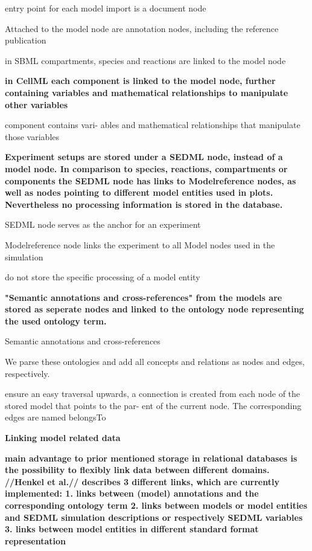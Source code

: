 \par entry point for each model import is a document node
\par Attached to the model node
are annotation nodes, including the reference publication
\par in SBML compartments, species and reactions are linked to the model node\par \textbf{in CellML each component is linked to the model node, further containing variables and mathematical relationships to manipulate other variables}

\par component contains vari-
ables and mathematical relationships that manipulate
those variables\par \textbf{Experiment setups are stored under a SEDML node, instead of a model node. In comparison to species, reactions, compartments or components the SEDML node has links to Modelreference nodes, as well as nodes pointing to different model entities used in plots. Nevertheless no processing information is stored in the database.}

\par SEDML node serves as the anchor for an experiment
\par  Modelreference node links the experiment to all
Model nodes used in the simulation
\par do not store the specific processing of a
model entity\par \textbf{"Semantic annotations and cross-references" from the models are stored as seperate nodes and linked to the ontology node representing the used ontology term.}

\par Semantic annotations and cross-references
\par  We parse these ontologies and add all concepts
and relations as nodes and edges, respectively.
\par ensure an easy traversal upwards, a connection is created
from each node of the stored model that points to the par-
ent of the current node. The corresponding edges are
named belongsTo\par \textbf{Linking model related data}
\par \textbf{main advantage to prior mentioned storage in relational databases is the possibility to flexibly link data between different domains. //Henkel et al.// describes 3 different links, which are currently implemented:
1. links between (model) annotations and the corresponding ontology term
2. links between models or model entities and SEDML simulation descriptions or respectively SEDML variables
3. links between model entities in different standard format representation}

